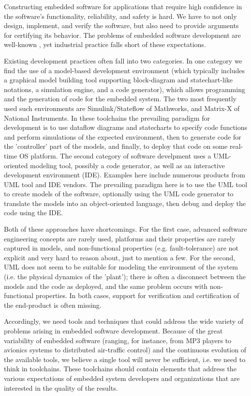 Constructing embedded software for applications that require high confidence in the software's functionality, reliability, and safety is hard. We have to not only design, implement, and verify the software, but also need to provide arguments for certifying its behavior. The problems of embedded software development are well-known \cite{HenSif:2006}, yet industrial practice falls short of these expectations. 

Existing development practices often fall into two categories. In one category we find the use of a model-based development environment (which typically includes a graphical model building tool supporting block-diagram and statechart-like notations, a simulation engine, and a code generator), which allows programming and the generation of code for the embedded system. The two most frequently used such environments are Simulink/Stateflow of Mathworks, and Matrix-X of National Instruments. In these toolchains the prevailing paradigm for development is to use dataflow diagrams and statecharts to specify code functions and perform simulations of the expected environment, then to generate code for the 'controller' part of the models, and finally, to deploy that code on some real-time OS platform. The second category of software develpment uses a UML-oriented modeling tool, possibly a code generator, as well as an interactive development environment (IDE). Examples here include numerous products from UML tool and IDE vendors. The prevailing paradigm here is to use the UML tool to create models of the software, optionally using the UML code generator to translate the models into an object-oriented language, then debug and deploy the code using the IDE. 

Both of these approaches have shortcomings. For the first case, advanced software engineering concepts are rarely used, platforms and their properties are rarely captured in models, and non-functional properties (e.g. fault-tolerance) are not explicit and very hard to reason about, just to mention a few. For the second, UML does not seem to be suitable for modeling the environment of the system (i.e. the physical dynamics of the 'plant'); there is often a disconnect between the models and the code as deployed, and the same problem occurs with non-functional properties. In both cases, support for verification and certification of the end-product is often missing. 

Accordingly, we need tools and techniques that could address the wide variety of problems arising in embedded software development. Because of the great variability of embedded software (ranging, for instance, from MP3 players to avionics systems to distributed air-traffic control) and the continuous evolution of the available tools, we believe a single tool will never be sufficient, i.e. we need to think in toolchains. These toolchains should contain elements that address the various expectations of embedded system developers and organizations that are interested in the quality of the results. 

